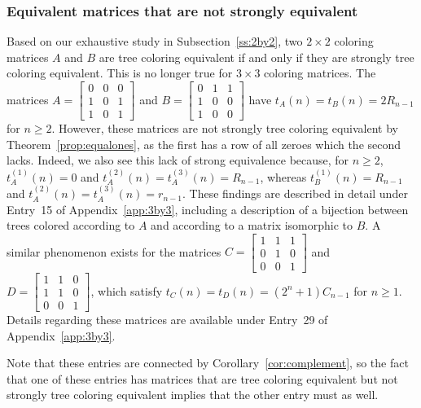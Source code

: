 \documentclass[12pt]{amsart}
\begin{document}
\subsubsection{Equivalent matrices that are not strongly equivalent}
Based on our exhaustive study in Subsection~\ref{ss:2by2}, two $2\times2$ coloring matrices $A$ and $B$ are tree coloring equivalent if and only if they are strongly tree coloring equivalent. 
This is no longer true for $3\times 3$ coloring matrices. The matrices $A=\begin{bmatrix}
    0&0&0\\
    1&0&1\\
    1&0&1
\end{bmatrix}$ and $B=\begin{bmatrix}
    0&1&1\\
    1&0&0\\
    1&0&0
\end{bmatrix}$ have $t_A(n)=t_B(n)=2R_{n-1}$ for $n\geq2$. However, these matrices are not strongly tree coloring equivalent by Theorem~\ref{prop:equalones}, as the first has a row of all zeroes which the second lacks. Indeed, we also see this lack of strong equivalence because, for $n\geq2$, $t^{(1)}_A(n)=0$ and $t^{(2)}_A(n)=t^{(3)}_A(n)=R_{n-1}$, whereas 
$t^{(1)}_B(n)=R_{n-1}$ and $t^{(2)}_A(n)=t^{(3)}_A(n)=r_{n-1}$. These findings are described in detail under Entry~15 of Appendix~\ref{app:3by3}, including a description of a bijection between trees colored according to $A$ and according to a matrix isomorphic to $B$.
A similar phenomenon exists for the matrices $C=\begin{bmatrix}
    1&1&1\\
    0&1&0\\
    0&0&1
\end{bmatrix}$ and $D=\begin{bmatrix}
    1&1&0\\
    1&1&0\\
    0&0&1
\end{bmatrix}$, which satisfy $t_C(n)=t_D(n)=\left(2^n+1\right)C_{n-1}$ for $n\geq1$. Details regarding these matrices are available under Entry~29 of Appendix~\ref{app:3by3}.

Note that these entries are connected by Corollary~\ref{cor:complement}, so the fact that one of these entries has matrices that are tree coloring equivalent but not strongly tree coloring equivalent implies that the other entry must as well.
\end{document}
